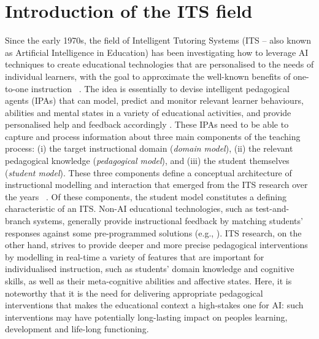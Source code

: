 \documentclass{article}
\begin{document}
\section{Introduction of the ITS field}
\label{intro}

Since the early 1970s, the field of Intelligent Tutoring Systems (ITS -- also known as Artificial Intelligence in Education) has been investigating how to leverage AI techniques to create educational technologies that are personalised to the needs of individual learners, with the goal to approximate the well-known benefits of one-to-one instruction ~\citep[for a recent review see][]{Boulay2016}. The idea is essentially to devise intelligent pedagogical agents (IPAs) that can model, predict and monitor relevant learner behaviours, abilities and mental states in a variety of educational activities, and provide personalised help and feedback accordingly \cite{Woolf-2009}. These IPAs need to be able to capture and process information about three main components of the teaching process: (i) the target instructional domain (\emph{domain model}), (ii) the relevant pedagogical knowledge (\emph{pedagogical model}), and (iii) the student themselves (\emph{student model}). These three components define a conceptual architecture of instructional modelling and interaction that emerged from the ITS research over the years ~\citep[e.g.,][]{Boulay2016}. Of these components, the student model constitutes a defining characteristic of an ITS. Non-AI educational technologies, such as test-and-branch systems, generally provide instructional feedback by matching students' responses against some pre-programmed solutions (e.g., \cite{Nesbit2014}). ITS research, on the other hand, strives to provide deeper and more precise pedagogical interventions by modelling in real-time a variety of features that are important for individualised instruction, such as students' domain knowledge and cognitive skills, as well as their meta-cognitive abilities and affective states. Here, it is noteworthy that it is the need for delivering appropriate pedagogical interventions that makes the educational context a high-stakes one for AI: such interventions may have potentially long-lasting impact on peoples learning, development and life-long functioning.
\end{document}
